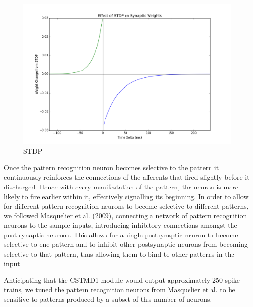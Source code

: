 \documentclass[a4paper,11pt]{article}
\begin{document}
\begin{figure}[h]
\centering
\includegraphics[scale = 0.35]{stdp}
\caption{STDP}
\end{figure}
	
	Once the pattern recognition neuron becomes selective to the pattern it continuously reinforces the connections of the afferents that fired slightly before it discharged. Hence with every manifestation of the pattern, the neuron is more likely to fire earlier within it, effectively signalling its beginning. In order to allow for different pattern recognition neurons to become selective to different patterns, we followed Masquelier et al. (2009), connecting a network of pattern recognition neurons to the sample inputs, introducing inhibitory connections amongst the post-synaptic neurons. This allows for a single postsynaptic neuron to become selective to one pattern and to inhibit other postsynaptic neurons from becoming selective to that pattern, thus allowing them to bind to other patterns in the input.\par

Anticipating that the CSTMD1 module would output approximately 250 spike trains, we tuned the pattern recognition neurons from Masquelier et al. to be sensitive to patterns produced by a subset of this number of neurons. 
\end{document}

